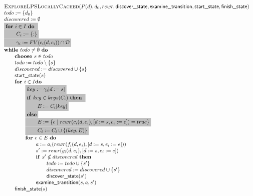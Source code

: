 \documentclass{article}
\newcommand{\emptymap}{\ensuremath{\{ : \}}}
\newcommand{\Space}{\text{\ }}
\newcommand{\If}{\text{\textbf{if }}}
\newcommand{\Do}{\text{\textbf{do }}}
\newcommand{\Then}{\text{\textbf{then }}}
\newcommand{\For}{\text{\textbf{for }}}
\newcommand{\While}{\text{\textbf{while }}}
\newcommand{\Choose}{\text{\textbf{choose }}}
\begin{document}
\[
\begin{tabular}{l}
\textsc{ExploreLPSLocallyCached}($P(d), d_0, rewr, \textsf{discover\_state}, \textsf{examine\_transition},
\textsf{start\_state}, \textsf{finish\_state})$ \\
$todo := \{d_0\}$ \\
$discovered := \emptyset$ \\
\colorbox{lightgray}{\For $i \in I$ \Do} \\
\colorbox{lightgray}{\qquad $C_i := \emptymap$} \\
\colorbox{lightgray}{\qquad $\gamma_i := FV(c_i(d, e_i)) \cap \mathcal{D}$} \\
$\While todo \neq \emptyset \Space \Do$ \\
\qquad $\Choose s \in todo$ \\
\qquad $todo := todo \setminus \{s\}$ \\
\qquad $discovered := discovered \cup \{s\}$ \\
\qquad $\textsf{start\_state}(s)$ \\
\qquad $\For i \in I \Do$ \\
\qquad \qquad \colorbox{lightgray}{$key := \gamma_i[d:=s]$} \\
\qquad \qquad \colorbox{lightgray}{\If $key \in keys(C_i)$ \Then} \\
\qquad \qquad \colorbox{lightgray}{\qquad $E := C_i[key]$} \\
\qquad \qquad \colorbox{lightgray}{\textbf{else}} \\
\qquad \qquad \colorbox{lightgray}{\qquad $E := \{ e \mid rewr(c_i(d, e_i), [d:=s,e_i:=e]) = true \}$} \\
\qquad \qquad \colorbox{lightgray}{\qquad $C_i := C_i \cup \{(key, E)\}$} \\
\qquad \qquad $\For e \in E  \Space \Do$ \\
\qquad \qquad \qquad $a := a_i(rewr(f_i(d,e_i), [d:=s,e_i:=e]))$ \\
\qquad \qquad \qquad $s' := rewr(g_i(d,e_i), [d:=s,e_i:=e])$ \\
\qquad \qquad \qquad $\If s' \notin discovered \Space \Then$ \\
\qquad \qquad \qquad \qquad $todo := todo \cup \{ s' \}$ \\
\qquad \qquad \qquad \qquad $discovered := discovered \cup \{s'\}$ \\
\qquad \qquad \qquad \qquad $\textsf{discover\_state}(s')$ \\
\qquad \qquad \qquad $\textsf{examine\_transition}(s, a, s')$ \\
\qquad $\textsf{finish\_state}(s)$ \\
\end{tabular}
\]
\end{document}
